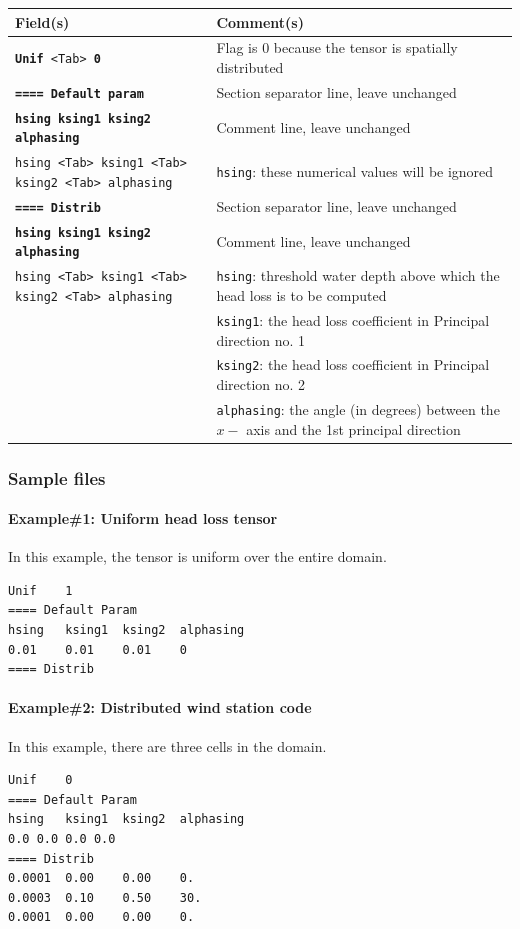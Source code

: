     \begin{tabular}{p{6cm} | p{9cm}}
    \hline
    Field(s) & Comment(s) \\
    \hline  \hline
    \texttt{\textbf{Unif} <Tab> \textbf{0}} & Flag is 0 because the tensor is spatially distributed  \\ \hline
     \texttt{\textbf{==== Default param}} & Section separator line, leave unchanged \\  \hline

    \texttt{\textbf{hsing ksing1 ksing2 alphasing}} & Comment line, leave unchanged \\  \hline
    \texttt{hsing <Tab> ksing1 <Tab> ksing2 <Tab> alphasing} & \texttt{hsing}: these numerical values will be ignored \\
    \texttt{\textbf{==== Distrib}} & Section separator line, leave unchanged \\  
    \hline

    \texttt{\textbf{hsing ksing1 ksing2 alphasing}} & Comment line, leave unchanged \\  \hline
    \texttt{hsing <Tab> ksing1 <Tab> ksing2 <Tab> alphasing} & \texttt{hsing}: threshold water depth above which the head loss is to be computed \\
     & \texttt{ksing1}: the head loss coefficient in Principal direction no. 1 \\
     & \texttt{ksing2}: the head loss coefficient in Principal direction no. 2 \\
     & \texttt{alphasing}: the angle (in degrees) between the $x-$ axis and the 1st principal direction \\
     \hline
    \end{tabular}
%
\subsubsection{Sample files}
%
\paragraph*{Example\#1: Uniform head loss tensor}
In this example, the tensor is uniform over the entire domain.
\begin{verbatim}
Unif	1
==== Default Param
hsing	ksing1	ksing2	alphasing
0.01	0.01	0.01	0
==== Distrib
\end{verbatim}
%
\paragraph*{Example\#2: Distributed wind station code}
In this example, there are three cells in the domain. 
\begin{verbatim}
Unif	0
==== Default Param
hsing	ksing1	ksing2	alphasing
0.0	0.0	0.0	0.0
==== Distrib
0.0001	0.00	0.00	0.	
0.0003	0.10	0.50	30.
0.0001	0.00	0.00	0.
\end{verbatim}